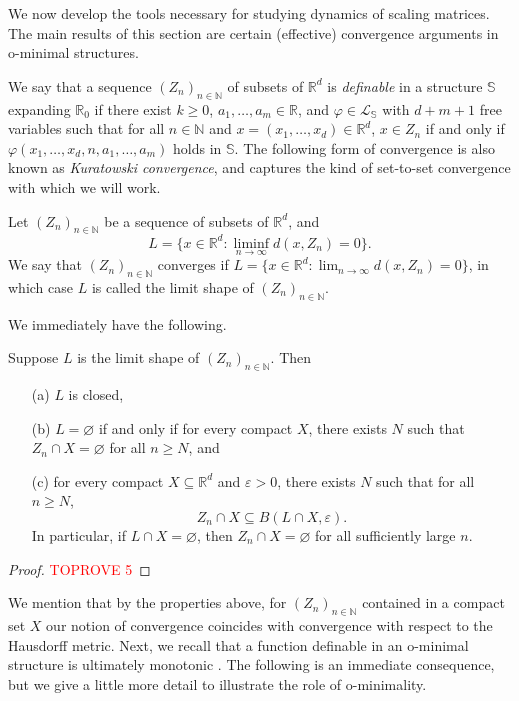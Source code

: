 \documentclass[a4paper,UKenglish,cleveref]{lipics-v2021}
\newcommand{\nat}{\mathbb{N}}
\newcommand{\rel}{\mathbb{R}}
\newcommand{\Lcal}{\mathcal{L}}
\newcommand{\Sb}{\mathbb{S}}
\newcommand{\seq}[1]{(#1)_{n \in \mathbb{N}}}
\begin{document}
We now develop the tools necessary for studying dynamics of scaling matrices.
The main results of this section are certain (effective) convergence arguments in o-minimal structures.


We say that a sequence $\seq{Z_n}$ of subsets of $\rel^d$ is \emph{definable} in a structure $\Sb$ expanding $\rel_0$ if there exist $k\ge0$, $a_1,\ldots,a_m \in \rel$, and $\varphi \in \Lcal_{\Sb}$ with $d+m+1$ free variables such that for all $n \in \nat$ and $x = (x_1,\ldots,x_d) \in \rel^d$, $x \in Z_n$ if and only if $\varphi(x_1,\ldots,x_d, n, a_1,\ldots,a_m)$ holds in $\Sb$.
The following form of convergence is also known as \emph{Kuratowski convergence}, and captures the kind of set-to-set convergence with which we will work.
\begin{definition}
	\label{def-limit-shape}
	Let $\seq{Z_n}$ be a sequence of subsets of $\rel^d$, and
	\[
	L = \{x \in \rel^d \colon \liminf_{n \to \infty} d(x, Z_n) = 0\}.
	\]
	We say that $\seq{Z_n}$ converges if $L = \{x \in \rel^d \colon \lim_{n \to \infty} d(x, Z_n) = 0\}$, in which case $L$ is called the limit shape of $\seq{Z_n}$.
\end{definition}
We immediately have the following.

\begin{lemma}
	\label{thm:limshape-properties}
	Suppose $L$ is the limit shape of $(Z_n)_{n \in \nat}$. 
	Then
	\begin{itemize}
		\item[(a)] $L$ is closed, 
		\item[(b)] $L = \varnothing$ if and only if for every compact $X$, there exists $N$ such that $Z_n \cap X = \varnothing$ for all $n \ge N$, and
		\item[(c)] for every compact $X \subseteq \rel^d$ and $\varepsilon > 0$, there exists $N$ such that for all $n \ge N$, 
		\[
		Z_n \cap X \subseteq B(L \cap X, \varepsilon).
		\]
		In particular, if $L \cap X = \varnothing$, then $Z_n \cap X = \varnothing$ for all sufficiently large $n$.
	\end{itemize}
\end{lemma}
\begin{proof}\textcolor{red}{TOPROVE 5}\end{proof}

We mention that by the properties above, for $\seq{Z_n}$ contained in a compact set $X$ our notion of convergence coincides with convergence with respect to the Hausdorff metric.
Next, we recall that a function definable in an o-minimal structure is ultimately monotonic \cite[Sec.~4.1]{vdD-geometric-categories}. 
The following is an immediate consequence, but we give a little more detail to illustrate the role of o-minimality.
\end{document}
